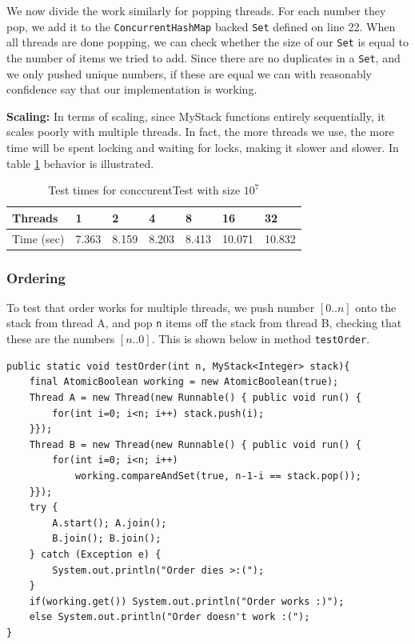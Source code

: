 \documentclass[a5paper]{article}
\begin{document}
We now divide the work similarly for popping threads. For each number they pop, we add it to the \texttt{ConcurrentHashMap} backed \texttt{Set} defined on line 22. 
When all threads are done popping, we can check whether the size of our \texttt{Set} is equal to the number of items we tried to add. 
Since there are no duplicates in a \texttt{Set}, and we only pushed unique numbers, if these are equal we can with reasonably confidence say that our implementation is working.

\textbf{Scaling:} In terms of scaling, since MyStack functions entirely sequentially, it scales poorly with multiple threads. In fact, the more threads we use, the more time will be spent 
locking and waiting for locks, making it slower and slower. In table \ref{table:concTest} behavior is illustrated.

\begin{table}[ht!]
\centering
\begin{tabular}{|l|l|l|l|l|l|l|}
\hline
Threads & 1 & 2 & 4 & 8 & 16 & 32 \\ \hline
Time (sec) & 7.363 & 8.159 & 8.203 & 8.413 & 10.071 & 10.832 \\ \hline
\end{tabular}
\caption{Test times for conccurentTest with size $10^7$}
\label{table:concTest}
\end{table}
\subsubsection{Ordering} \label{sec:ordering}
To test that order works for multiple threads, we push number $[0..n]$ onto the stack from thread A, and pop \texttt{n} items off the stack from thread B,
checking that these are the numbers $[n..0]$.
This is shown below in method \texttt{testOrder}.

\begin{lstlisting}
public static void testOrder(int n, MyStack<Integer> stack){
    final AtomicBoolean working = new AtomicBoolean(true);
    Thread A = new Thread(new Runnable() { public void run() {
        for(int i=0; i<n; i++) stack.push(i);
    }});
    Thread B = new Thread(new Runnable() { public void run() {
        for(int i=0; i<n; i++) 
            working.compareAndSet(true, n-1-i == stack.pop());
    }});
    try {
        A.start(); A.join();
        B.join(); B.join();
    } catch (Exception e) { 
        System.out.println("Order dies >:("); 
    }
    if(working.get()) System.out.println("Order works :)");
    else System.out.println("Order doesn't work :(");
}
\end{lstlisting}
\end{document}

